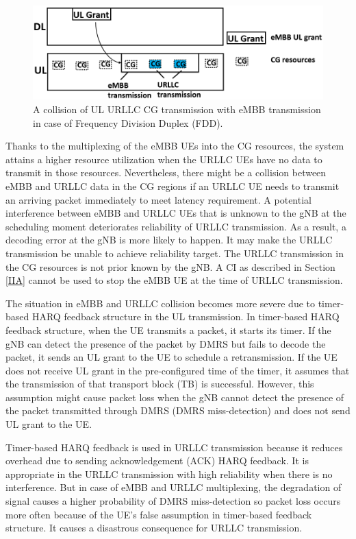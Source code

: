 \documentclass{ieeeaccess}
\begin{document}
\begin{figure}[htbp]
\centerline{\includegraphics[scale=0.32]{fig1.PNG}}
\caption{A collision of UL URLLC CG transmission with eMBB transmission in case of Frequency Division Duplex (FDD).}
\label{fig1}
\end{figure}

Thanks to the multiplexing of the eMBB UEs into the CG resources, the system attains a higher resource utilization when the URLLC UEs have no data to transmit in those resources. Nevertheless, there might be a collision between eMBB and URLLC data in the CG regions if an URLLC UE needs to transmit an arriving packet immediately to meet latency requirement. A potential interference between eMBB and URLLC UEs that is unknown to the gNB at the scheduling moment deteriorates reliability of URLLC transmission. As a result, a decoding error at the gNB is more likely to happen. It may make the URLLC transmission be unable to achieve reliability target. The URLLC transmission in the CG resources is not prior known by the gNB. A CI as described in Section \ref{IIA} cannot be used to stop the eMBB UE at the time of URLLC transmission.

The situation in eMBB and URLLC collision becomes more severe due to timer-based HARQ feedback structure in the UL transmission. In timer-based HARQ feedback structure, when the UE transmits a packet, it starts its timer. If the gNB can detect the presence of the packet by DMRS but fails to decode the packet, it sends an UL grant to the UE to schedule a retransmission. If the UE does not receive UL grant in the pre-configured time of the timer, it assumes that the transmission of that transport block (TB) is successful. However, this assumption might cause packet loss when the gNB cannot detect the presence of the packet transmitted through DMRS (DMRS miss-detection) and does not send UL grant to the UE. 

Timer-based HARQ feedback is used in URLLC transmission because it reduces overhead due to sending acknowledgement (ACK) HARQ feedback. It is appropriate in the URLLC transmission with high reliability when there is no interference. But in case of eMBB and URLLC multiplexing, the degradation of signal causes a higher probability of DMRS miss-detection so packet loss occurs more often because of the UE's false assumption in timer-based feedback structure. It causes a disastrous consequence for URLLC transmission.
\end{document}
